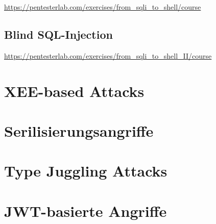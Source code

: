 \url{https://pentesterlab.com/exercises/from_sqli_to_shell/course}

\section{Blind SQL-Injection}

\url{https://pentesterlab.com/exercises/from_sqli_to_shell_II/course}

\chapter{XEE-based Attacks}

\chapter{Serilisierungsangriffe}

\chapter{Type Juggling Attacks}

\chapter{JWT-basierte Angriffe}
